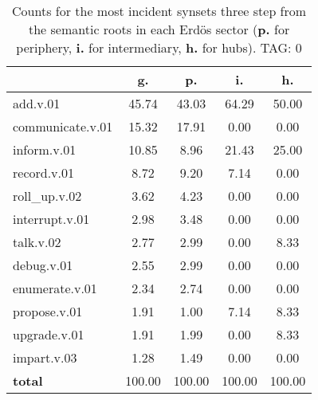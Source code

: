 \begin{table}[h!]
\begin{center}
\begin{tabular}{| l | c | c | c | c |}\hline
 & g. & p. & i. & h. \\\hline
add.v.01 & 45.74  & 43.03  & 64.29  & 50.00 \\\hline
communicate.v.01 & 15.32  & 17.91  & 0.00  & 0.00 \\\hline
inform.v.01 & 10.85  & 8.96  & 21.43  & 25.00 \\\hline
record.v.01 & 8.72  & 9.20  & 7.14  & 0.00 \\\hline
roll\_up.v.02 & 3.62  & 4.23  & 0.00  & 0.00 \\\hline
interrupt.v.01 & 2.98  & 3.48  & 0.00  & 0.00 \\\hline
talk.v.02 & 2.77  & 2.99  & 0.00  & 8.33 \\\hline
debug.v.01 & 2.55  & 2.99  & 0.00  & 0.00 \\\hline
enumerate.v.01 & 2.34  & 2.74  & 0.00  & 0.00 \\\hline
propose.v.01 & 1.91  & 1.00  & 7.14  & 8.33 \\\hline
upgrade.v.01 & 1.91  & 1.99  & 0.00  & 8.33 \\\hline
impart.v.03 & 1.28  & 1.49  & 0.00  & 0.00 \\\hline
{{\bf total}} & 100.00  & 100.00  & 100.00  & 100.00 \\\hline
\end{tabular}
\caption{Counts for the most incident synsets three step from the semantic roots in each Erd\"os sector ({\bf p.} for periphery, {\bf i.} for intermediary, {\bf h.} for hubs). TAG: 0}
\end{center}
\end{table}